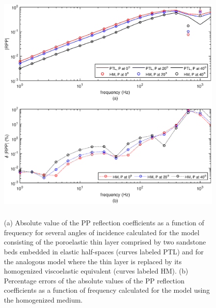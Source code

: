 \documentclass[draft]{agujournal2019}
\begin{document}
\begin{figure}[!ht]
\centering
        \includegraphics[width= 130mm, height=120mm]{Figure3.eps}
\caption{ (a) Absolute value of the PP reflection coefficients as a function of frequency for several angles of incidence calculated for the model consisting of the poroelastic thin layer comprised by two sandstone beds embedded in elastic half-spaces (curves labeled PTL) and for the analogous model where the thin layer is replaced by its homogenized viscoelastic equivalent (curves labeled HM). (b) Percentage errors of the absolute values of the PP reflection coefficients as a function of frequency calculated for the model using the homogenized medium.}
\label{fig.3}
\end{figure}
\end{document}
